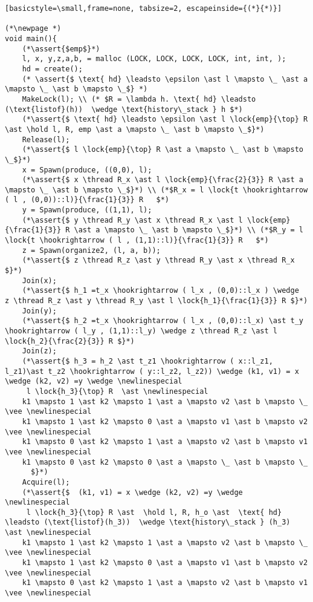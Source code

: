 \documentclass[8pt]{article}
\newcommand{\lock}[2]{ \square \hspace{-1ex} \xrightarrow[#1]{#2}}
\newcommand{\thread}{\ocircle \hspace{-1ex} \rightarrow}
\newcommand{\hold}{\text{Hold }}
\newcommand{\assert}[1]{\textcolor{blue}{ \{ #1 \}  } }
\newcommand{\newlinespecial}{\newline \hphantom{100pt}}
\begin{document}
\begin{lstlisting}[basicstyle=\small,frame=none, tabsize=2, escapeinside={(*}{*)}]
		
(*\newpage *)		
void main(){
	(*\assert{$emp$}*)
	l, x, y,z,a,b, = malloc (LOCK, LOCK, LOCK, LOCK, int, int, );
	hd = create();
	(* \assert{$ \text{ hd} \leadsto \epsilon \ast l \mapsto \_ \ast a \mapsto \_ \ast b \mapsto \_$} *)
	MakeLock(l); \\ (* $R = \lambda h. \text{ hd} \leadsto (\text{listof}(h))  \wedge \text{history\_stack } h $*)
	(*\assert{$ \text{ hd} \leadsto \epsilon \ast l \lock{emp}{\top} R \ast \hold l, R, emp \ast a \mapsto \_ \ast b \mapsto \_$}*) 	
	Release(l);
	(*\assert{$ l \lock{emp}{\top} R \ast a \mapsto \_ \ast b \mapsto \_$}*)
	x = Spawn(produce, ((0,0), l);
	(*\assert{$ x \thread R_x \ast l \lock{emp}{\frac{2}{3}} R \ast a \mapsto \_ \ast b \mapsto \_$}*) \\ (*$R_x = l \lock{t \hookrightarrow ( l , (0,0))::l)}{\frac{1}{3}} R   $*)
	y = Spawn(produce, ((1,1), l);
	(*\assert{$ y \thread R_y \ast x \thread R_x \ast l \lock{emp}{\frac{1}{3}} R \ast a \mapsto \_ \ast b \mapsto \_$}*) \\ (*$R_y = l \lock{t \hookrightarrow ( l , (1,1)::l)}{\frac{1}{3}} R   $*)
	z = Spawn(organize2, (l, a, b));
	(*\assert{$ z \thread R_z \ast y \thread R_y \ast x \thread R_x $}*)
	Join(x);
	(*\assert{$ h_1 =t_x \hookrightarrow ( l_x , (0,0)::l_x ) \wedge  z \thread R_z \ast y \thread R_y \ast l \lock{h_1}{\frac{1}{3}} R $}*)
	Join(y);
	(*\assert{$ h_2 =t_x \hookrightarrow ( l_x , (0,0)::l_x) \ast t_y \hookrightarrow ( l_y , (1,1)::l_y) \wedge z \thread R_z \ast l \lock{h_2}{\frac{2}{3}} R $}*)
	Join(z);
	(*\assert{$ h_3 = h_2 \ast t_z1 \hookrightarrow ( x::l_z1, l_z1)\ast t_z2 \hookrightarrow ( y::l_z2, l_z2)) \wedge (k1, v1) = x \wedge (k2, v2) =y \wedge \newlinespecial
	 l \lock{h_3}{\top} R  \ast \newlinespecial
	k1 \mapsto 1 \ast k2 \mapsto 1 \ast a \mapsto v2 \ast b \mapsto \_ \vee \newlinespecial
	k1 \mapsto 1 \ast k2 \mapsto 0 \ast a \mapsto v1 \ast b \mapsto v2 \vee \newlinespecial
	k1 \mapsto 0 \ast k2 \mapsto 1 \ast a \mapsto v2 \ast b \mapsto v1 \vee \newlinespecial
	k1 \mapsto 0 \ast k2 \mapsto 0 \ast a \mapsto \_ \ast b \mapsto \_
	  $}*)
	Acquire(l);
	(*\assert{$  (k1, v1) = x \wedge (k2, v2) =y \wedge \newlinespecial
	 l \lock{h_3}{\top} R \ast  \hold l, R, h_o \ast  \text{ hd} \leadsto (\text{listof}(h_3))  \wedge \text{history\_stack } (h_3) \ast \newlinespecial
	k1 \mapsto 1 \ast k2 \mapsto 1 \ast a \mapsto v2 \ast b \mapsto \_ \vee \newlinespecial
	k1 \mapsto 1 \ast k2 \mapsto 0 \ast a \mapsto v1 \ast b \mapsto v2 \vee \newlinespecial
	k1 \mapsto 0 \ast k2 \mapsto 1 \ast a \mapsto v2 \ast b \mapsto v1 \vee \newlinespecial

\end{lstlisting}
\end{document}
